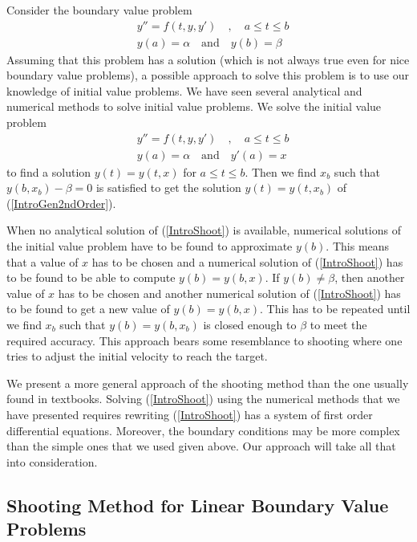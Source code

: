 Consider the boundary value problem
\begin{equation} \label{IntroGen2ndOrder}
\begin{split}
& y'' = f(t,y,y')  \quad , \quad a \leq t \leq b \\
& y(a) = \alpha \quad \text{and} \quad y(b) = \beta      
\end{split}
\end{equation}
Assuming that this problem has a solution (which is not always true
even for nice boundary value problems), a possible approach to solve
this problem is to use our knowledge of initial value problems.
We have seen several analytical and numerical methods to solve initial
value problems.   We solve the initial value problem
\begin{equation}\label{IntroShoot}
\begin{split}
& y'' = f(t,y,y')  \quad , \quad a \leq t \leq b \\
& y(a) = \alpha \quad \text{and} \quad y'(a) = x
\end{split}
\end{equation}
to find a solution $y(t) = y(t,x)$ for $a \leq t \leq b$.  Then we
find $x_b$ such that $y(b,x_b) - \beta = 0$ is satisfied to get the
solution $y(t) = y(t,x_b)$ of (\ref{IntroGen2ndOrder}).

When no analytical solution of (\ref{IntroShoot}) is available,
numerical solutions of the initial value problem have to be found to
approximate $y(b)$.  This means that a value of $x$ has to be chosen
and a numerical solution of (\ref{IntroShoot}) has to be found
to be able to compute $y(b) = y(b,x)$.  If $y(b) \neq \beta$, then
another value of $x$ has to be chosen and another numerical solution
of (\ref{IntroShoot}) has to be found to get a new value of
$y(b) = y(b,x)$.  This has to be repeated until we find $x_b$ such
that $y(b) = y(b,x_b)$ is closed enough to $\beta$ to meet the
required accuracy.  This approach bears some resemblance to shooting
where one tries to adjust the initial velocity to reach the target.

We present a more general approach of the shooting method than the one
usually found in textbooks.  Solving (\ref{IntroShoot}) using
the numerical methods that we have presented requires rewriting 
(\ref{IntroShoot}) has a system of first order differential equations.
Moreover, the boundary conditions may be more complex than the simple
ones that we used given above.  Our approach will take all that into
consideration.

\subsection{Shooting Method for Linear Boundary Value Problems}
\label{SMLBVP}

